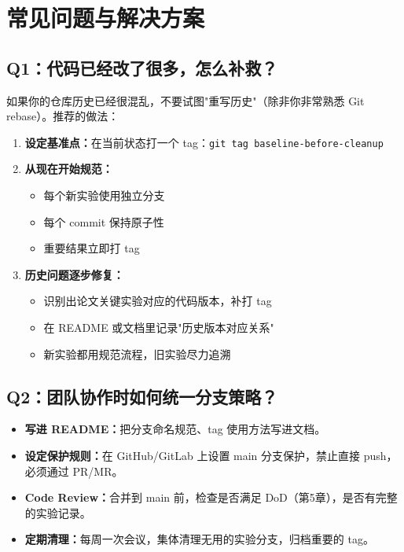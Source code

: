 \section{常见问题与解决方案}

\subsection{Q1：代码已经改了很多，怎么补救？}

如果你的仓库历史已经很混乱，不要试图"重写历史"（除非你非常熟悉 Git rebase）。推荐的做法：

\begin{enumerate}
  \item \textbf{设定基准点：}在当前状态打一个 tag：\texttt{git tag baseline-before-cleanup}
  \item \textbf{从现在开始规范：}
  \begin{itemize}
    \item 每个新实验使用独立分支
    \item 每个 commit 保持原子性
    \item 重要结果立即打 tag
  \end{itemize}
  \item \textbf{历史问题逐步修复：}
  \begin{itemize}
    \item 识别出论文关键实验对应的代码版本，补打 tag
    \item 在 README 或文档里记录"历史版本对应关系"
    \item 新实验都用规范流程，旧实验尽力追溯
  \end{itemize}
\end{enumerate}

\subsection{Q2：团队协作时如何统一分支策略？}

\begin{itemize}
  \item \textbf{写进 README：}把分支命名规范、tag 使用方法写进文档。
  \item \textbf{设定保护规则：}在 GitHub/GitLab 上设置 main 分支保护，禁止直接 push，必须通过 PR/MR。
  \item \textbf{Code Review：}合并到 main 前，检查是否满足 DoD（第5章），是否有完整的实验记录。
  \item \textbf{定期清理：}每周一次会议，集体清理无用的实验分支，归档重要的 tag。
\end{itemize}

